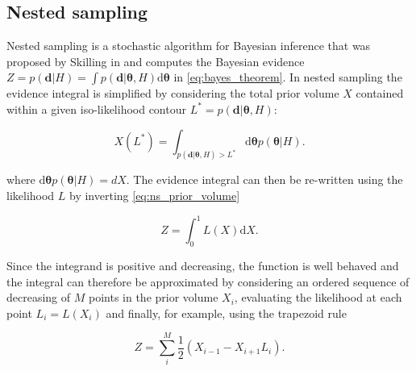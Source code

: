 \documentclass[%
 reprint,
nofootinbib,
 amsmath,amssymb,
 aps,
 prd,
]{revtex4-2}
\newcommand{\diff}{\textrm{d}}
\renewcommand{\vec}[1]{\boldsymbol{#1}}
\begin{document}


\subsection{Nested sampling}\label{sec:nested_sampling}

Nested sampling is a stochastic algorithm for Bayesian inference that was proposed by Skilling in \cite{Skilling:2006} and computes the Bayesian evidence $Z = p(\vec{d}|H) = \int p(\vec{d}|\vec{\theta}, H) \diff\vec{\theta}$ in \cref{eq:bayes_theorem}. In nested sampling the evidence integral is simplified by considering the total prior volume $X$ contained within a given iso-likelihood contour $L^{*} = p(\vec{d}|\vec{\theta}, H)$:

\begin{equation}\label{eq:ns_prior_volume}
    X(L^{*}) = \int_{p(\vec{d}|\vec{\theta}, H) > L^{*}} \diff \vec{\theta} p(\vec{\theta}|H).
\end{equation}

where $\diff \vec{\theta} p(\vec{\theta}|H) = dX$. The evidence integral can then be re-written using the likelihood $L$ by inverting \cref{eq:ns_prior_volume}

\begin{equation}\label{eq:ns_evidence}
    Z = \int_{0}^{1} L(X)\diff X.
\end{equation}

Since the integrand is positive and decreasing, the function is well behaved and the integral can therefore be approximated by considering an ordered sequence of decreasing of $M$ points in the prior volume $X_{i}$, evaluating the likelihood at each point $L_{i} = L(X_{i})$ and finally, for example, using the trapezoid rule

\begin{equation}\label{eq:ns_trapezoid}
    Z = \sum_{i}^{M} \frac{1}{2} (X_{i-1} - X_{i+1}L_{i}).
\end{equation}
\end{document}
